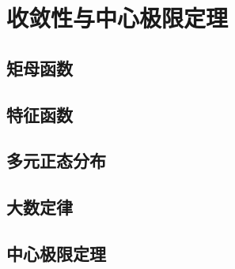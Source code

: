 \chapter{收敛性与中心极限定理}

\section{矩母函数}

\section{特征函数}

\section{多元正态分布}

\section{大数定律}

\section{中心极限定理}